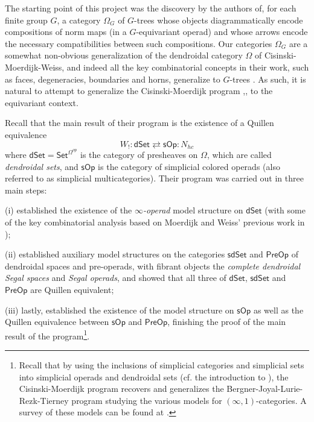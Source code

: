 \documentclass[a4paper,10pt
 ,draft
]{article}%
\begin{document}
The starting point of this project was the discovery by the authors of,
for each finite group $G$,
a category $\Omega_G$ of $G$-trees whose objects diagrammatically encode compositions of norm maps 
(in a $G$-equivariant operad)
and whose arrows encode the necessary compatibilities between such compositions.
Our categories $\Omega_G$ are a somewhat non-obvious  generalization of the dendroidal category $\Omega$
of Cisinski-Moerdijk-Weiss, 
and indeed all the key combinatorial concepts in their work,
such as faces, degeneracies, boundaries and horns, generalize to $G$-trees \cite[\S 5,\S 6]{Per18}.
As such, it is natural to attempt to generalize the 
Cisinski-Moerdijk program \cite{CM11},\cite{CM13a},\cite{CM13b} to the equivariant context. 

Recall that the main result of their program is the existence of a Quillen equivalence
\[
	W_{!} \colon \mathsf{dSet} 
		\rightleftarrows
	\mathsf{sOp}  \colon N_{hc} 
\]
where $\mathsf{dSet} = \mathsf{Set}^{\Omega^{op}} $
is the category of presheaves on $\Omega$, 
which are called \textit{dendroidal sets},
and 
$\mathsf{sOp}$ is the category of simplicial colored operads (also referred to as simplicial multicategories).
Their program was carried out in three main steps:
\begin{inparaenum}
	\item[(i)] \cite{CM11} established the existence of the \textit{$\infty$-operad} model structure on $\mathsf{dSet}$ 
	(with some of the key combinatorial analysis based on Moerdijk and Weiss' previous work in \cite{MW09});
	\item[(ii)] \cite{CM13a} established auxiliary model structures on the categories $\mathsf{sdSet}$ and $\mathsf{PreOp}$
              of dendroidal spaces and pre-operads, with fibrant objects the \textit{complete dendroidal Segal spaces} and \textit{Segal operads},
              and showed that all three of $\mathsf{dSet}$, $\mathsf{sdSet}$ and $\mathsf{PreOp}$ are Quillen equivalent;
	\item[(iii)] lastly, \cite{CM13b} established the existence of the model structure on $\mathsf{sOp}$ as well as the Quillen equivalence between $\mathsf{sOp}$ and $\mathsf{PreOp}$, finishing the proof of the main result of the program\footnote{Recall that by using the inclusions of simplicial categories and simplicial sets into simplicial operads and dendroidal sets (cf. the introduction to \cite{CM13b}), the Cisinski-Moerdijk program recovers and generalizes the Bergner-Joyal-Lurie-Rezk-Tierney program studying the various models for $(\infty,1)$-categories. A survey of these models can be found at \cite{Ber10}.}.
\end{inparaenum}
\end{document}
